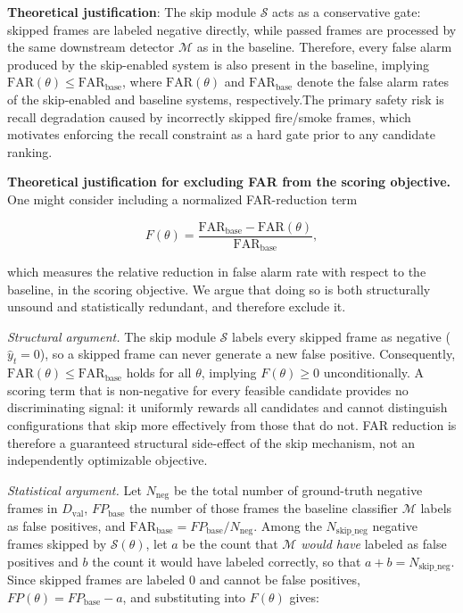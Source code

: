 \textbf{Theoretical justification}: The skip module $\mathcal{S}$ acts as a
conservative gate: skipped frames are labeled negative directly, while passed
frames are processed by the same downstream detector $\mathcal{M}$ as in the
baseline. Therefore, every false alarm produced by the skip-enabled system is
also present in the baseline, implying $\mathrm{FAR}(\theta) \leq \mathrm{FAR}_{\text{base}}$, where $\mathrm{FAR}(\theta)$ and $\mathrm{FAR}_{\text{base}}$ denote the false alarm rates of the skip-enabled and baseline systems, respectively.The primary safety risk is recall degradation
caused by incorrectly skipped fire/smoke frames, which motivates enforcing the
recall constraint as a hard gate prior to any candidate ranking.


\textbf{Theoretical justification for excluding FAR from the scoring objective.}
One might consider including a normalized FAR-reduction term

\[ F(\theta) = \frac{\mathrm{FAR}_{\text{base}} -
\mathrm{FAR}(\theta)}{\mathrm{FAR}_{\text{base}}}, \]

which measures the relative reduction in false alarm rate with respect to the
baseline, in the scoring objective. We argue that doing so is both structurally
unsound and statistically redundant, and therefore exclude it.

\textit{Structural argument.}
The skip module $\mathcal{S}$ labels every skipped frame as negative
($\hat{y}_t = 0$), so a skipped frame can never generate a new false positive.
Consequently, $\mathrm{FAR}(\theta) \leq \mathrm{FAR}_{\text{base}}$ holds for
all $\theta$, implying $F(\theta) \geq 0$ unconditionally. A scoring term that
is non-negative for every feasible candidate provides no discriminating signal:
it uniformly rewards all candidates and cannot distinguish configurations that
skip more effectively from those that do not. FAR reduction is therefore a
guaranteed structural side-effect of the skip mechanism, not an independently
optimizable objective.

\textit{Statistical argument.}
Let $N_{\text{neg}}$ be the total number of ground-truth negative frames in
$D_{\text{val}}$, $FP_{\text{base}}$ the number of those frames the baseline
classifier $\mathcal{M}$ labels as false positives, and
$\mathrm{FAR}_{\text{base}} = FP_{\text{base}} / N_{\text{neg}}$.
Among the $N_{\text{skip\_neg}}$ negative frames skipped by $\mathcal{S}(\theta)$,
let $a$ be the count that $\mathcal{M}$ \emph{would have} labeled as false
positives and $b$ the count it would have labeled correctly, so that
$a + b = N_{\text{skip\_neg}}$.
Since skipped frames are labeled $0$ and cannot be false positives,
$FP(\theta) = FP_{\text{base}} - a$, and substituting into $F(\theta)$ gives:

